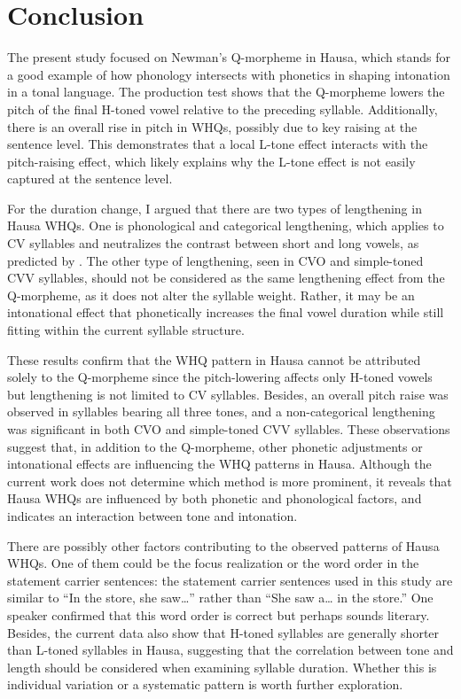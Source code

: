 \documentclass[output=paper,colorlinks,citecolor=brown
]{langscibook}
\begin{document}
\section{Conclusion}
The present study focused on Newman’s Q-morpheme in Hausa, which stands for a good example of how phonology intersects with phonetics in shaping intonation in a tonal language. The production test shows that the Q-morpheme lowers the pitch of the final H-toned vowel relative to the preceding syllable. Additionally, there is an overall rise in pitch in WHQs, possibly due to key raising at the sentence level. This demonstrates that a local L-tone effect interacts with the pitch-raising effect, which likely explains why the L-tone effect is not easily captured at the sentence level.

For the duration change, I argued that there are two types of lengthening in Hausa WHQs. One is phonological and categorical lengthening, which applies to CV syllables and neutralizes the contrast between short and long vowels, as predicted by \citet{newmans1981q}. The other type of lengthening, seen in CVO and simple-toned CVV syllables, should not be considered as the same lengthening effect from the Q-morpheme, as it does not alter the syllable weight. Rather, it may be an intonational effect that phonetically increases the final vowel duration while still fitting within the current syllable structure.

These results confirm that the WHQ pattern in Hausa cannot be attributed solely to the Q-morpheme since the pitch-lowering affects only H-toned vowels but lengthening is not limited to CV syllables. Besides, an overall pitch raise was observed in syllables bearing all three tones, and a non-categorical lengthening was significant in both CVO and simple-toned CVV syllables. These observations suggest that, in addition to the Q-morpheme, other phonetic adjustments or intonational effects are influencing the WHQ patterns in Hausa. Although the current work does not determine which method is more prominent, it reveals that Hausa WHQs are influenced by both phonetic and phonological factors, and indicates an interaction between tone and intonation. 

There are possibly other factors contributing to the observed patterns of Hausa WHQs. One of them could be the focus realization or the word order in the statement carrier sentences: the statement carrier sentences used in this study are similar to “In the store, she saw…” rather than “She saw a… in the store.” One speaker confirmed that this word order is correct but perhaps sounds literary. Besides, the current data also show that H-toned syllables are generally shorter than L-toned syllables in Hausa, suggesting that the correlation between tone and length should be considered when examining syllable duration. Whether this is individual variation or a systematic pattern is worth further exploration.
\end{document}
